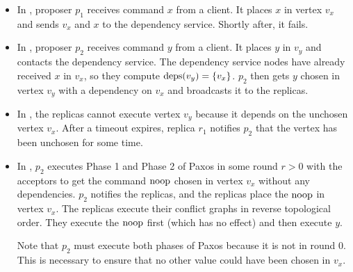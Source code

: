 \begin{itemize}
  \item
    In , proposer $p_1$ receives command $x$ from
    a client. It places $x$ in vertex $v_x$ and sends $v_x$ and $x$ to the
    dependency service. Shortly after, it fails.

  \item
    In , proposer $p_2$ receives command
    $y$ from a client. It places $y$ in $v_y$ and contacts the dependency
    service. The dependency service nodes have already received $x$ in $v_x$,
    so they compute $\text{deps}(v_y) = \{v_x\}$. $p_2$ then gets $y$ chosen in
    vertex $v_y$ with a dependency on $v_x$ and broadcasts it to the replicas.

  \item
    In , the replicas cannot execute
    vertex $v_y$ because it depends on the unchosen vertex $v_x$. After a
    timeout expires, replica $r_1$ notifies $p_2$ that the vertex has been
    unchosen for some time.

  \item
    In , $p_2$ executes Phase 1 and Phase
    2 of Paxos in some round $r > 0$ with the acceptors to get the command
    $\text{noop}$ chosen in vertex $v_x$ without any dependencies. $p_2$ notifies the
    replicas, and the replicas place the $\text{noop}$ in vertex $v_x$. The replicas
    execute their conflict graphs in reverse topological order. They execute
    the $\text{noop}$ first (which has no effect) and then execute $y$.

    Note that $p_2$ must execute both phases of Paxos because it is not in
    round $0$. This is necessary to ensure that no other value could have been
    chosen in $v_x$.
\end{itemize}

%

%

